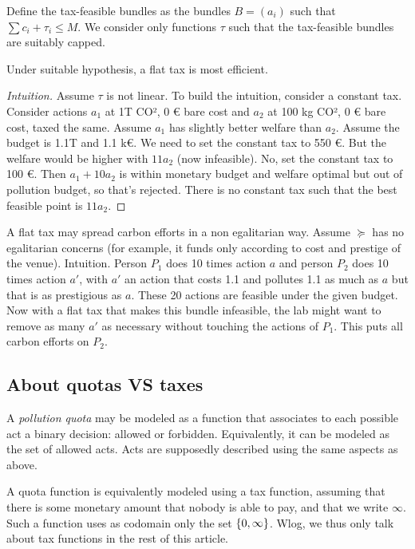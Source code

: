 \documentclass[version=3.21, pagesize, twoside=off, bibliography=totoc, DIV=calc, fontsize=12pt, a4paper, french, english]{scrartcl}
\begin{document}
Define the tax-feasible bundles as the bundles $B = (a_i)$ such that $\sum c_i + \tau_i ≤ M$.
We consider only functions $\tau$ such that the tax-feasible bundles are suitably capped.

\begin{theorem}
	Under suitable hypothesis, a flat tax is most efficient.
\end{theorem}
\begin{proof}[Intuition]
	Assume $\tau$ is not linear. To build the intuition, consider a constant tax. Consider actions $a_1$ at 1T CO², 0 € bare cost and $a_2$ at 100 kg CO², 0 € bare cost, taxed the same. Assume $a_1$ has slightly better welfare than $a_2$.
	Assume the budget is 1.1T and 1.1 k€. We need to set the constant tax to 550 €. But the welfare would be higher with $11 a_2$ (now infeasible). No, set the constant tax to 100 €. Then $a_1 + 10 a_2$ is within monetary budget and welfare optimal but out of pollution budget, so that’s rejected. There is no constant tax such that the best feasible point is $11 a_2$.
\end{proof}
		
A flat tax may spread carbon efforts in a non egalitarian way. Assume $\succeq$ has no egalitarian concerns (for example, it funds only according to cost and prestige of the venue).
Intuition. Person $P_1$ does 10 times action $a$ and person $P_2$ does 10 times action $a'$, with $a'$ an action that costs 1.1 and pollutes 1.1 as much as $a$ but that is as prestigious as $a$. These 20 actions are feasible under the given budget. Now with a flat tax that makes this bundle infeasible, the lab might want to remove as many $a'$ as necessary without touching the actions of $P_1$. This puts all carbon efforts on $P_2$.

\subsection{About quotas VS taxes}
A \emph{pollution quota} may be modeled as a function that associates to each possible act a binary decision: allowed or forbidden. Equivalently, it can be modeled as the set of allowed acts. Acts are supposedly described using the same aspects as above.

A quota function is equivalently modeled using a tax function, assuming that there is some monetary amount that nobody is able to pay, and that we write $\infty$. Such a function uses as codomain only the set $\{0, \infty\}$. Wlog, we thus only talk about tax functions in the rest of this article.
\end{document}
